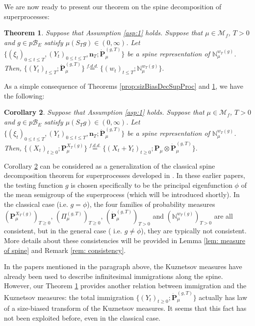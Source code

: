 \documentclass[UTF8]{pkuthss}
\theoremstyle{plain}
\newtheorem{thm}{Theorem}[section]
\newtheorem{cor}[thm]{Corollary}
\theoremstyle{definition}
\numberwithin{equation}{section}
\begin{document}
	We are now ready to present our theorem on the spine decomposition of superprocesses:
\begin{thm}\label{prop:sizBiasNMeas}
	Suppose that Assumption \ref{asp:1} holds.
	Suppose that $\mu \in \mathcal M_f$, $T >0$ and $g \in p\mathscr B_E$ satisfy $\mu(S_Tg)\in (0,\infty)$.
	Let $\{(\xi_t)_{0\leq t\leq T}, (Y_t)_{0\leq t\leq T}, \mathbf n_T; \dot {\mathbf P}^{(g,T)}_\mu\}$ be a spine representation of $\mathbb N_\mu^{w_T(g)}$.
	Then,
$
	\{(Y_t)_{t\leq T}; \dot{\mathbf P}^{(g,T)}_\mu\}
	\overset{f.d.d.}{=} \{(w_t)_{t\leq T}; \mathbb N_\mu^{w_T(g)}\}.
$
\end{thm}
	As a simple consequence of Theorems \ref{prop:sizBiasDecSupProc} and  \ref{prop:sizBiasNMeas}, we have the following:
\begin{cor}\label{cro: spine decomposition}
	Suppose that Assumption \ref{asp:1} holds.
	Suppose that $\mu \in \mathcal M_f$, $T >0$ and $g \in p\mathscr B_E$ satisfy $\mu(S_Tg)\in (0,\infty)$.
	Let $\{(\xi_t)_{0\leq t\leq T}, (Y_t)_{0\leq t\leq T}, \mathbf n_T; \dot {\mathbf P}^{(g,T)}_\mu\}$ be a spine representation of $\mathbb N_\mu^{w_T(g)}$.
	Then,
$
	\{(X_t)_{t\geq 0}; \mathbf P_\mu^{X_T(g)}\}
	\overset{f.d.d.}{=} \{(X_t + Y_t)_{t\geq 0}; \mathbf P_\mu \otimes \dot {\mathbf P}^{(g,T)}_\mu\}.
$
\end{cor}
	
	Corollary \ref{cro: spine decomposition} can be considered as a generalization of the classical spine decomposition theorem for superprocesses developed in \cite{EckhoffKyprianouWinkel2015Spines, EnglanderKyprianou2004Local, LiuRenSong2009LlogL}.
		In these earlier papers, the testing function $g$ is chosen specifically to be  the principal eigenfunction $\phi$ of the mean semigroup of the superprocess (which will be introduced shortly).
In the classical case (i.e. $g = \phi$), the four families of probability measures
	$(\mathbf P_\mu^{X_T(g)})_{T\geq 0}$, $(\Pi_\mu^{(g, T)})_{T\geq 0}$, $(\dot{\mathbf P}_{\mu}^{(g,T)})_{T>0}$
		and $(\mathbb N_\mu^{w_T(g)})_{T> 0}$ are all consistent,
	but  in the general case ( i.e. $g\neq \phi$), they are typically not consistent.
	More details about these consistencies will be provided in Lemma \ref{lem: measure of spine} and Remark \ref{rem: consistency}.
	
In the papers mentioned in the paragraph above, the Kuznetsov measures have already been used to describe infinitesimal immigrations along the spine.
	However, our Theorem \ref{prop:sizBiasNMeas} provides
   another  relation between
	immigration and the Kuznetsov measures: the total immigration $\{(Y_t)_{t\geq 0}; \dot {\mathbf P}^{(g,T)}_\mu\}$ actually has law of a size-biased transform of the Kuznetsov measures.
It seems that this fact has not been exploited before, even in the classical case.
\end{document}
